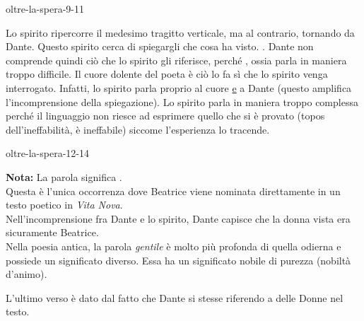 \documentclass[preview]{standalone}
\begin{document}
\begin{snippet}{oltre-la-spera-9-11}

    Lo spirito ripercorre il medesimo tragitto verticale, ma al contrario, tornando da Dante.
    Questo spirito cerca di spiegargli che cosa ha visto.
    .
    Dante non comprende quindi ciò che lo spirito gli riferisce, perché
    , ossia parla in maniera troppo difficile.
    Il cuore dolente del poeta è ciò lo fa sì che lo spirito venga interrogato.
    Infatti, lo spirito parla proprio al cuore \underline{e} a Dante (questo amplifica l'incomprensione della spiegazione).
    Lo spirito parla in maniera troppo complessa perché il linguaggio non riesce
    ad esprimere quello che si è provato (topos dell'ineffabilità, è ineffabile)
    siccome l'esperienza lo tracende.
\end{snippet}

\begin{snippet}{oltre-la-spera-12-14}

    \textbf{\color{red}Nota:} La parola  significa . \\
    Questa è l'unica occorrenza dove Beatrice viene nominata direttamente in un testo poetico in \textit{Vita Nova}.\\
    Nell'incomprensione fra Dante e lo spirito, Dante capisce che la donna vista era sicuramente
    Beatrice. \\
    Nella poesia antica, la parola \textit{gentile} è molto più profonda di quella odierna
    e possiede un significato diverso. Essa ha un significato nobile di purezza (nobiltà d'animo).
    
    L'ultimo verso è dato dal fatto che Dante si stesse riferendo a delle Donne nel testo.
\end{snippet}
\end{document}

